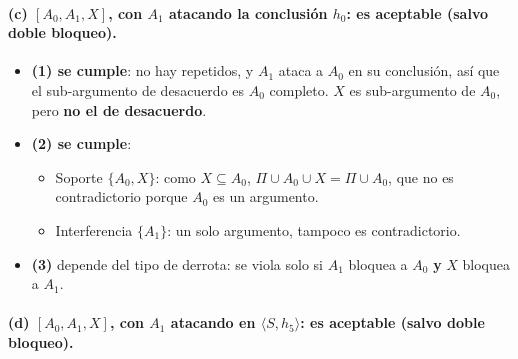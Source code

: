 \documentclass[11pt,a4paper]{article}
\begin{document}
\paragraph{(c) $[A_0, A_1, X]$, con $A_1$ atacando la conclusión $h_0$: es aceptable (salvo doble bloqueo).}

\begin{center}
\end{center}

\begin{itemize}
  \item \textbf{(1) se cumple}: no hay repetidos, y $A_1$ ataca a $A_0$ en su conclusión, así que el sub-argumento de desacuerdo es $A_0$ completo. $X$ es sub-argumento de $A_0$, pero \textbf{no el de desacuerdo}.
  \item \textbf{(2) se cumple}:
  \begin{itemize}
    \item Soporte $\{A_0, X\}$: como $X \subseteq A_0$, $\Pi \cup A_0 \cup X = \Pi \cup A_0$, que no es contradictorio porque $A_0$ es un argumento.
    \item Interferencia $\{A_1\}$: un solo argumento, tampoco es contradictorio.
  \end{itemize}
  \item \textbf{(3)} depende del tipo de derrota: se viola solo si $A_1$ bloquea a $A_0$ \textbf{y} $X$ bloquea a $A_1$.
\end{itemize}

\paragraph{(d) $[A_0, A_1, X]$, con $A_1$ atacando en $\langle S, h_5\rangle$: es aceptable (salvo doble bloqueo).}
\end{document}
